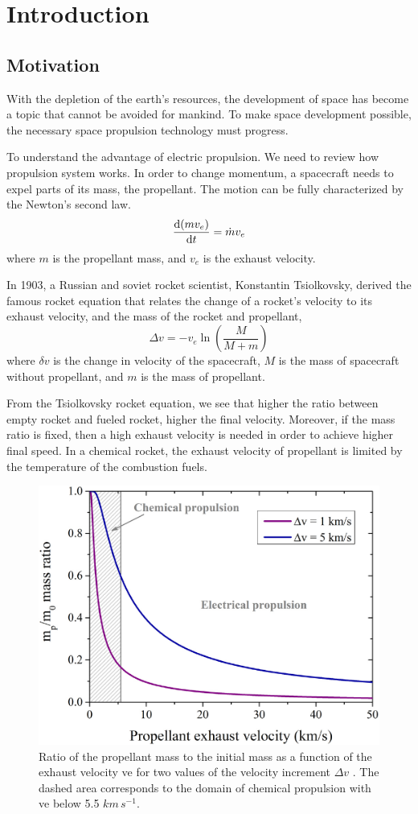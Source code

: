 \chapter{Introduction}
\section{Motivation}
With the depletion of the earth's resources, the development of space has become a topic that cannot be avoided for mankind. To make space development possible, the necessary space propulsion technology must progress. 

To understand the advantage of electric propulsion. We need to review how propulsion system works. In order to change momentum, a spacecraft needs to expel parts of its mass, the propellant. The motion can be fully characterized by the Newton's second law.
\[ \dv{(mv_e)}{t} = \dot{m}v_e \]
where $m$ is the propellant mass, and $v_e$ is the exhaust velocity.

In 1903, a Russian and soviet rocket scientist, Konstantin Tsiolkovsky, derived the famous rocket equation that relates the change of a rocket's velocity to its exhaust velocity, and the mass of the rocket and propellant,
\[ \Delta v = -v_e \ln(\frac{M}{M+m}) \]
where $\delta v$ is the change in velocity of the spacecraft, $M$ is the mass of spacecraft without propellant, and $m$ is the mass of propellant.

From the Tsiolkovsky rocket equation, we see that higher the ratio between empty rocket and fueled rocket, higher the final velocity. Moreover, if the mass ratio is fixed, then a high exhaust velocity is needed in order to achieve higher final speed. In a chemical rocket, the exhaust velocity of propellant is limited by the temperature of the combustion fuels.

\begin{figure}[H]
	\centering
	\includegraphics[width=0.7\linewidth]{img/introduction/mass_ratio_vs_exhaust_velocity}
	\caption{Ratio of the propellant mass to the initial mass as a function of the exhaust velocity ve for two values of the velocity increment $\Delta v$ . The dashed area corresponds to the domain of chemical propulsion with ve below 5.5 $km \, s^{-1}$. \cite{mazouffre_electric_2016} }
	\label{fig:massratiovsexhaustvelocity}
\end{figure}



